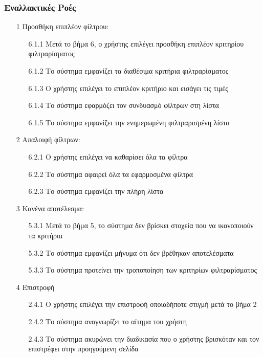 \documentclass[12pt,a4paper,twoside]{book}
\begin{document}
\subsubsection{Εναλλακτικές Ροές}
\begin{enumerate}
  \item[1 ] Προσθήκη επιπλέον φίλτρου:
        \begin{enumerate}
          \item[6.1.1 ] Μετά το βήμα 6, ο χρήστης επιλέγει προσθήκη επιπλέον κριτηρίου φιλτραρίσματος
          \item[6.1.2 ] Το σύστημα εμφανίζει τα διαθέσιμα κριτήρια φιλτραρίσματος %
          \item[6.1.3 ] Ο χρήστης επιλέγει το επιπλέον κριτήριο και εισάγει τις τιμές
          \item[6.1.4 ] Το σύστημα εφαρμόζει τον συνδυασμό φίλτρων στη λίστα %
          \item[6.1.5 ] Το σύστημα εμφανίζει την ενημερωμένη φιλτραρισμένη λίστα
        \end{enumerate}
  \item[2 ] Απαλοιφή φίλτρων:
        \begin{enumerate}
          \item[6.2.1 ] Ο χρήστης επιλέγει να καθαρίσει όλα τα φίλτρα
          \item[6.2.2 ] Το σύστημα αφαιρεί όλα τα εφαρμοσμένα φίλτρα
          \item[6.2.3 ] Το σύστημα εμφανίζει την πλήρη λίστα
        \end{enumerate}
  \item[3 ] Κανένα αποτέλεσμα:
        \begin{enumerate}
          \item[5.3.1 ] Μετά το βήμα 5, το σύστημα δεν βρίσκει στοχεία που να ικανοποιούν τα κριτήρια %
          \item[5.3.2 ] Το σύστημα εμφανίζει μήνυμα ότι δεν βρέθηκαν αποτελέσματα %
          \item[5.3.3 ] Το σύστημα προτείνει την τροποποίηση των κριτηρίων φιλτραρίσματος
        \end{enumerate}
  \item[4 ] Επιστροφή
        \begin{enumerate}
          \item[2.4.1 ] Ο χρήστης επιλέγει την επιστροφή οποιαδήποτε στιγμή μετά το βήμα 2 %
          \item[2.4.2 ] Το σύστημα αναγνωρίζει το αίτημα του χρήστη %
          \item[2.4.3 ] Το σύστημα ακυρώνει την διαδικασία που ο χρήστης βρισκόταν και τον επιστρέφει στην προηγούμενη σελίδα %
        \end{enumerate}
\end{enumerate}
\end{document}
